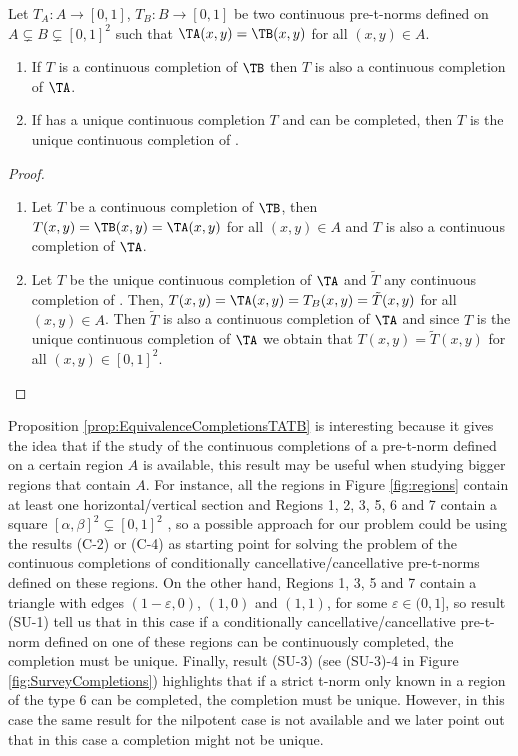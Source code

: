 \begin{proposition}\label{prop:EquivalenceCompletionsTATB}
	Let $T_A: A \to [0,1]$, $T_B: B \to [0,1]$ be two continuous pre-t-norms defined on $A \subsetneq B \subsetneq [0,1]^2$ such that $\TA(x,y)=\TB(x,y)$ for all $(x,y) \in A$.
	\begin{enumerate}[label=(\roman*)]
		\item If $T$ is a continuous completion of $\TB$ then $T$ is also a continuous completion of $\TA$.
		\item If \TA has a unique continuous completion $T$ and \TB can be completed, then $T$ is the unique continuous completion of \TB.
	\end{enumerate} 
\end{proposition}

\begin{proof}~~
	\begin{enumerate}[label=(\roman*)]
		\item Let $T$ be a continuous completion of $\TB$, then $T(x,y)=\TB(x,y)=\TA(x,y)$ for all $(x,y) \in A$ and $T$ is also a continuous completion of $\TA$.
		\item Let $T$ be the unique continuous completion of $\TA$ and $\tilde{T}$ any continuous completion of \TB. Then, $T(x,y)=\TA(x,y)=T_B(x,y)=\tilde{T}(x,y)$ for all $(x,y) \in A$. Then $\tilde{T}$ is also a continuous completion of $\TA$ and since $T$ is the unique continuous completion of $\TA$ we obtain that $T(x,y)=\tilde{T}(x,y)$ for all $(x,y) \in [0,1]^2$. \qedhere
	\end{enumerate}
\end{proof}

Proposition \ref{prop:EquivalenceCompletionsTATB} is interesting because it gives the idea that if the study of the continuous completions of a pre-t-norm defined on a certain region $A$ is available, this result may be useful when studying bigger regions that contain $A$. For instance, all the regions in Figure \ref{fig:regions} contain at least one horizontal/vertical section and Regions 1, 2, 3, 5, 6 and 7 contain a square $[\alpha,\beta]^2 \subsetneq [0,1]^2$ , so a possible approach for our problem could be using the results (C-2) or (C-4) as starting point for solving the problem of the continuous completions of conditionally cancellative/cancellative pre-t-norms defined on these regions. On the other hand, Regions 1, 3, 5 and 7 contain a triangle with edges $(1-\varepsilon,0)$, $(1,0)$ and $(1,1)$, for some $\varepsilon \in (0,1]$, so result (SU-1) tell us that in this case if a conditionally cancellative/cancellative pre-t-norm defined on one of these regions can be continuously completed, the completion must be unique. Finally, result (SU-3) (see (SU-3)-4 in Figure \ref{fig:SurveyCompletions}) highlights that if a strict t-norm only known in a region of the type 6 can be completed, the completion must be unique. However, in this case the same result for the nilpotent case is not available and we later point out that in this case a completion might not be unique.

